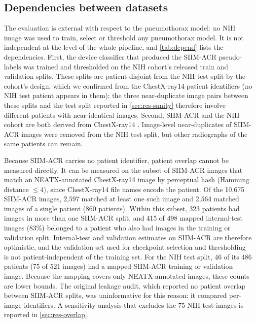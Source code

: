 \documentclass{ieeeaccess}
\begin{document}
\subsection{Dependencies between datasets}
\label{sec:dependencies}
The evaluation is external with respect to the pneumothorax model: no NIH image was used to train, select or threshold any pneumothorax model. It is not independent at the level of the whole pipeline, and \cref{tab:depend} lists the dependencies. First, the device classifier that produced the SIIM-ACR pseudo-labels was trained and thresholded on the NIH cohort's released train and validation splits. These splits are patient-disjoint from the NIH test split by the cohort's design, which we confirmed from the ChestX-ray14 patient identifiers (no NIH test patient appears in them); the three near-duplicate image pairs between these splits and the test split reported in \cref{sec:res-sanity} therefore involve different patients with near-identical images. Second, SIIM-ACR and the NIH cohort are both derived from ChestX-ray14 \cite{wang2017chestxray8}. Image-level near-duplicates of SIIM-ACR images were removed from the NIH test split, but other radiographs of the same patients can remain.

Because SIIM-ACR carries no patient identifier, patient overlap cannot be measured directly. It can be measured on the subset of SIIM-ACR images that match an NEATX-annotated ChestX-ray14 image \cite{jimenez2023shortcuts} by perceptual hash (Hamming distance $\le 4$), since ChestX-ray14 file names encode the patient. Of the 10{,}675 SIIM-ACR images, 2{,}597 matched at least one such image and 2{,}564 matched images of a single patient (860 patients). Within this subset, 323 patients had images in more than one SIIM-ACR split, and 415 of 498 mapped internal-test images (83\%) belonged to a patient who also had images in the training or validation split. Internal-test and validation estimates on SIIM-ACR are therefore optimistic, and the validation set used for checkpoint selection and thresholding is not patient-independent of the training set. For the NIH test split, 46 of its 486 patients (75 of 521 images) had a mapped SIIM-ACR training or validation image. Because the mapping covers only NEATX-annotated images, these counts are lower bounds. The original leakage audit, which reported no patient overlap between SIIM-ACR splits, was uninformative for this reason: it compared per-image identifiers. A sensitivity analysis that excludes the 75 NIH test images is reported in \cref{sec:res-overlap}.
\end{document}
